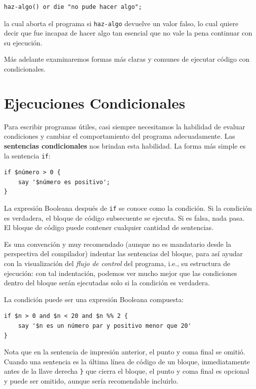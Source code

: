 \begin{verbatim}
haz-algo() or die "no pude hacer algo";
\end{verbatim}
%
la cual aborta el programa si {\tt haz-algo} devuelve un 
valor falso, lo cual quiere decir que fue incapaz de hacer 
algo tan esencial que no vale la pena continuar con su
ejecución.

Más adelante examinaremos formas más claras y comunes
de ejecutar código con condicionales.

\section{Ejecuciones Condicionales}
\label{conditional.execution}

Para escribir programas útiles, casi siempre necesitamos la habilidad 
de evaluar condiciones y cambiar el comportamiento del programa
adecuadamente. Las {\bf sentencias condicionales} nos brindan esta
habilidad. La forma más simple es la sentencia {\tt if}:

\begin{verbatim}
if $número > 0 {
    say '$número es positivo';
}
\end{verbatim}
%
La expresión Booleana después de {\tt if} se conoce 
como la condición. Si la condición es verdadera, el
bloque de código subsecuente se ejecuta. Si es falsa, 
nada pasa. El bloque de código puede contener cualquier
cantidad de sentencias.

Es una convención y muy recomendado (aunque no es mandatario
desde la perspectiva del compilador) indentar las sentencias
del bloque, para así ayudar con la visualización del 
\emph{flujo de control} del programa, i.e., su estructura
de ejecución: con tal indentación, podemos ver mucho mejor 
que las condiciones dentro del bloque serán ejecutadas solo 
si la condición es verdadera.

La condición puede ser una expresión Booleana compuesta:
\begin{verbatim}
if $n > 0 and $n < 20 and $n %% 2 {
    say '$n es un número par y positivo menor que 20'
}
\end{verbatim}
%
Nota que en la sentencia de impresión anterior, el punto y coma
final se omitió. Cuando una sentencia es la última línea de
código de un bloque, inmediatamente antes de la llave derecha
{\tt \}} que cierra el bloque, el punto y coma final es opcional
y puede ser omitido, aunque sería recomendable incluirlo.

